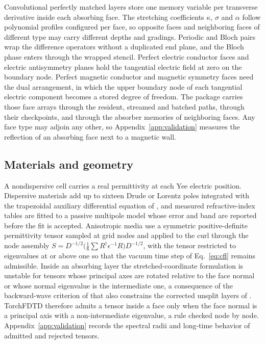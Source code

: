 \documentclass[11pt,a4paper]{article}
\begin{document}
Convolutional perfectly matched layers \citep{roden2000} store one memory variable per transverse derivative inside each absorbing face. The stretching coefficients $\kappa$, $\sigma$ and $\alpha$ follow polynomial profiles configured per face, so opposite faces and neighboring faces of different type may carry different depths and gradings. Periodic and Bloch pairs wrap the difference operators without a duplicated end plane, and the Bloch phase enters through the wrapped stencil. Perfect electric conductor faces and electric antisymmetry planes hold the tangential electric field at zero on the boundary node. Perfect magnetic conductor and magnetic symmetry faces need the dual arrangement, in which the upper boundary node of each tangential electric component becomes a stored degree of freedom. The package carries those face arrays through the resident, streamed and batched paths, through their checkpoints, and through the absorber memories of neighboring faces. Any face type may adjoin any other, so Appendix~\ref{app:validation} measures the reflection of an absorbing face next to a magnetic wall.

\subsection{Materials and geometry}

A nondispersive cell carries a real permittivity at each Yee electric position. Dispersive materials add up to sixteen Drude or Lorentz poles integrated with the trapezoidal auxiliary differential equation of \citet{okoniewski1997}, and measured refractive-index tables are fitted to a passive multipole model whose error and band are reported before the fit is accepted. Anisotropic media \citep{oskooi2009} use a symmetric positive-definite permittivity tensor sampled at grid nodes and applied to the curl through the node assembly $S=D^{-1/2}\bigl(\tfrac18\sum R^{\dagger}\epsilon^{-1}R\bigr)D^{-1/2}$, with the tensor restricted to eigenvalues at or above one so that the vacuum time step of Eq.~\eqref{eq:cfl} remains admissible. Inside an absorbing layer the stretched-coordinate formulation is unstable for tensors whose principal axes are rotated relative to the face normal or whose normal eigenvalue is the intermediate one, a consequence of the backward-wave criterion of \citet{becache2003} that also constrains the corrected unsplit layers of \citet{oskooi2011}. TorchFDTD therefore admits a tensor inside a face only when the face normal is a principal axis with a non-intermediate eigenvalue, a rule checked node by node. Appendix~\ref{app:validation} records the spectral radii and long-time behavior of admitted and rejected tensors.
\end{document}
